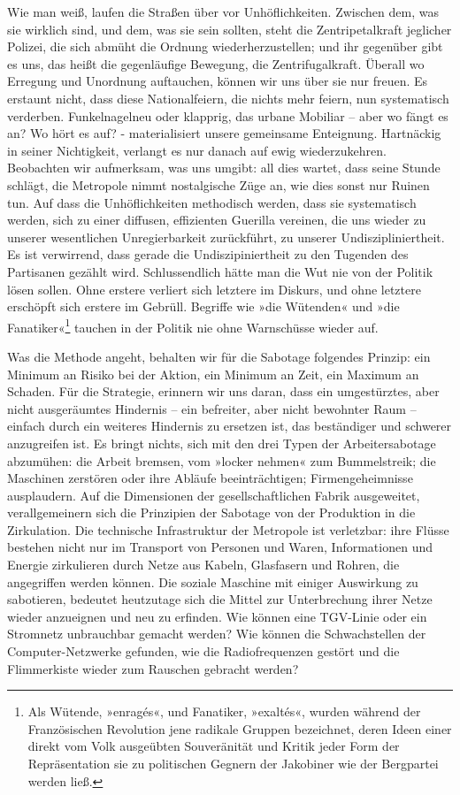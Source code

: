 Wie man weiß, laufen die Straßen über vor Unhöflichkeiten. Zwischen
dem, was sie wirklich sind, und dem, was sie sein sollten, steht
die Zentripetalkraft jeglicher Polizei, die sich abmüht die Ordnung
wiederherzustellen; und ihr gegenüber gibt es uns, das heißt die
gegenläufige Bewegung, die Zentrifugalkraft. Überall wo Erregung
und Unordnung auftauchen, können wir uns über sie nur freuen. Es
erstaunt nicht, dass diese Nationalfeiern, die nichts mehr feiern,
nun systematisch verderben. Funkelnagelneu oder klapprig, das
urbane Mobiliar – aber wo fängt es an? Wo hört es auf? -
materialisiert unsere gemeinsame Enteignung. Hartnäckig in seiner
Nichtigkeit, verlangt es nur danach auf ewig wiederzukehren.
Beobachten wir aufmerksam, was uns umgibt: all dies wartet, dass
seine Stunde schlägt, die Metropole nimmt nostalgische Züge an, wie
dies sonst nur Ruinen tun.
Auf dass die Unhöflichkeiten methodisch werden, dass sie
systematisch werden, sich zu einer diffusen, effizienten Guerilla
vereinen, die uns wieder zu unserer wesentlichen Unregierbarkeit
zurückführt, zu unserer Undiszipliniertheit. Es ist verwirrend,
dass gerade die Undiszipiniertheit zu den Tugenden des Partisanen
gezählt wird. Schlussendlich hätte man die Wut nie von der Politik
lösen sollen. Ohne erstere verliert sich letztere im Diskurs, und
ohne letztere erschöpft sich erstere im Gebrüll. Begriffe wie »die
Wütenden« und »die Fanatiker«\footnote{
Als Wütende, »enragés«, und Fanatiker, »exaltés«, wurden während
der Französischen Revolution jene radikale Gruppen bezeichnet,
deren Ideen einer direkt vom Volk ausgeübten Souveränität und
Kritik jeder Form der Repräsentation sie zu politischen Gegnern der
Jakobiner wie der Bergpartei werden ließ.
}%
tauchen in der Politik nie ohne
Warnschüsse wieder auf.

\extrapar{}

Was die Methode angeht, behalten wir für die Sabotage folgendes
Prinzip: ein Minimum an Risiko bei der Aktion, ein Minimum an Zeit,
ein Maximum an Schaden. Für die Strategie, erinnern wir uns daran,
dass ein umgestürztes, aber nicht ausgeräumtes Hindernis – ein
befreiter, aber nicht bewohnter Raum – einfach durch ein weiteres
Hindernis zu ersetzen ist, das beständiger und schwerer anzugreifen
ist.
Es bringt nichts, sich mit den drei Typen der Arbeitersabotage
abzumühen: die Arbeit bremsen, vom »locker nehmen« zum
Bummelstreik; die Maschinen zerstören oder ihre Abläufe
beeinträchtigen; Firmengeheimnisse ausplaudern. Auf die Dimensionen
der gesellschaftlichen Fabrik ausgeweitet, verallgemeinern sich die
Prinzipien der Sabotage von der Produktion in die Zirkulation. Die
technische Infrastruktur der Metropole ist verletzbar: ihre Flüsse
bestehen nicht nur im Transport von Personen und Waren,
Informationen und Energie zirkulieren durch Netze aus Kabeln,
Glasfasern und Rohren, die angegriffen werden können. Die soziale
Maschine mit einiger Auswirkung zu sabotieren, bedeutet heutzutage
sich die Mittel zur Unterbrechung ihrer Netze wieder anzueignen und
neu zu erfinden. Wie können eine TGV-Linie oder ein Stromnetz
unbrauchbar gemacht werden? Wie können die Schwachstellen der
Computer-Netzwerke gefunden, wie die Radiofrequenzen gestört und
die Flimmerkiste wieder zum Rauschen gebracht werden?

